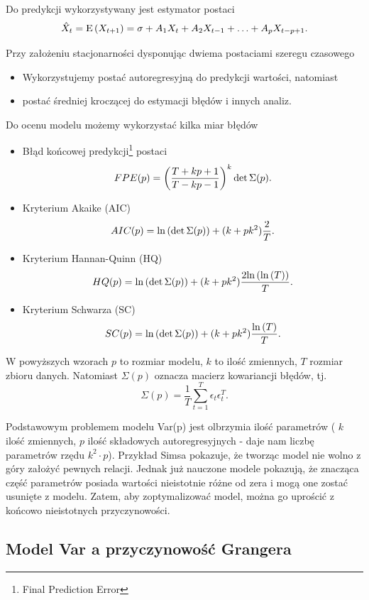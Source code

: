 \documentclass[10pt,a4paper]{book}
\begin{document}
Do predykcji wykorzystywany jest estymator postaci
$$
\predict{X}{t} = \Ex{X_{t+1} } = \sigma + A_1 X_t + A_2 X_{t-1} + \ldots + A_p X_{t-p+1}. 
$$

\begin{remark}
Przy założeniu stacjonarności dysponując dwiema postaciami szeregu czasowego 
\begin{itemize}
\item Wykorzystujemy postać autoregresyjną do predykcji wartości, natomiast
\item postać średniej kroczącej do estymacji błędów i innych analiz.
\end{itemize}
\end{remark}

Do ocenu modelu możemy wykorzystać kilka miar błędów
\begin{itemize}
\item Błąd końcowej predykcji\footnote{Final Prediction Error} postaci 
$$
FPE(p) = {\left( {\frac{T+kp+1}{T-kp-1}} \right)}^k \det \Sigma(p).
$$
\item Kryterium Akaike (AIC)
$$
AIC(p) = {{\ln}\left( {\det \Sigma(p)} \right)} + (k + pk^2) \frac{2}{T}.
$$
\item Kryterium Hannan-Quinn (HQ) 
$$
HQ(p) = {{\ln}\left( {\det \Sigma(p)} \right)} + (k + pk^2) \frac{2 {{\ln}\left( {{{\ln}\left( {T} \right)} } \right)} }{T}.
$$
\item Kryterium Schwarza (SC) 
$$
SC(p) = {{\ln}\left( {\det \Sigma(p)} \right)} + (k + pk^2) \frac{{{\ln}\left( {T} \right)} }{T} .
$$
\end{itemize}
W powyższych wzorach $p$ to rozmiar modelu, $k$ to ilość zmiennych, $T$ rozmiar zbioru danych. Natomiast $\Sigma(p)$ oznacza macierz kowariancji błędów, tj.
$$
\Sigma(p) = \frac{1}{T} \sum_{t=1}^{T} \epsilon_t \epsilon_t^T.
$$

Podstawowym problemem modelu Var(p) jest olbrzymia ilość parametrów ( $k$ ilość zmiennych, $p$ ilość składowych autoregresyjnych - daje nam liczbę parametrów rzędu $ k^2 \cdot p$). Przykład Simsa pokazuje, że tworząc model nie wolno z góry założyć pewnych relacji. Jednak już nauczone modele pokazują, że znacząca część parametrów posiada wartości nieistotnie różne od zera i mogą one zostać usunięte z modelu. Zatem,  aby zoptymalizować model, można go uprościć z końcowo nieistotnych przyczynowości.

\subsection{Model Var a przyczynowość Grangera}
\end{document}

